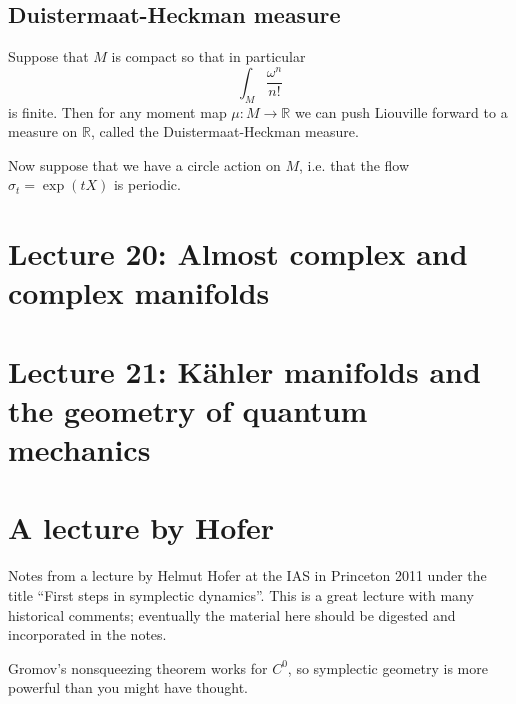 \documentclass[11pt]{article} %
\begin{document}
\subsection*{Duistermaat-Heckman measure}
Suppose that $M$ is compact so that in particular 
$$
\int_M \frac{\omega^n}{n!} 
$$
is finite. Then for any moment map $\mu:M \rightarrow \mathbb{R}$ we can push Liouville forward to a measure on $\mathbb{R}$, called the Duistermaat-Heckman measure. 

Now suppose that we have a circle action on $M$, i.e. that the flow $\sigma_t = \operatorname{exp}(tX)$ is periodic. 


\section*{Lecture 20: Almost complex and complex manifolds}

\section*{Lecture 21: Kähler manifolds and the geometry of quantum mechanics}

\section*{A lecture by Hofer}

Notes from a lecture by Helmut Hofer at the IAS in Princeton 2011 under the title ``First steps in symplectic dynamics''. This is a great lecture with many historical comments; eventually the material here should be digested and incorporated in the notes. 

Gromov's nonsqueezing theorem works for $C^0$, so symplectic geometry is more powerful than you might have thought. 
\end{document}
